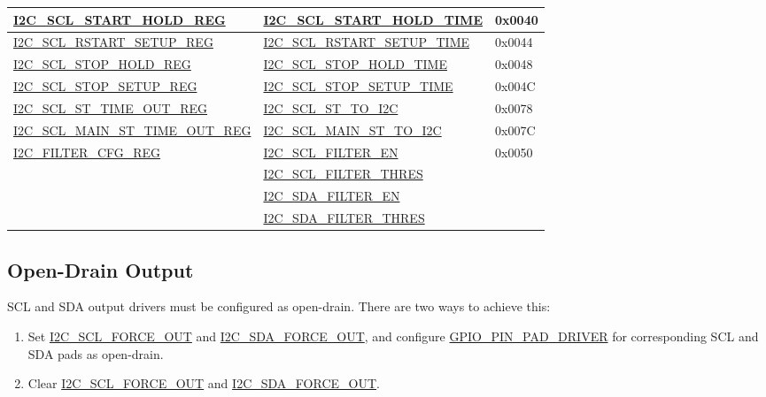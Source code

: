 \documentclass[main\_\_EN.tex]{subfiles}
\begin{document}
\begin{longtable}{ | p{6cm} | p{7cm} | p{2cm} | }
\hyperref[regdesc:I2CSCLSTARTHOLDREG]{I2C\_SCL\_START\_HOLD\_REG} & \hyperref[fielddesc:I2CSCLSTARTHOLDTIME]{I2C\_SCL\_START\_HOLD\_TIME} & 0x0040  \\ \hline
\hyperref[regdesc:I2CSCLRSTARTSETUPREG]{I2C\_SCL\_RSTART\_SETUP\_REG} & \hyperref[fielddesc:I2CSCLRSTARTSETUPTIME]{I2C\_SCL\_RSTART\_SETUP\_TIME} & 0x0044  \\ \hline

\hyperref[regdesc:I2CSCLSTOPHOLDREG]{I2C\_SCL\_STOP\_HOLD\_REG} & \hyperref[fielddesc:I2CSCLSTOPHOLDTIME]{I2C\_SCL\_STOP\_HOLD\_TIME} & 0x0048  \\ \hline
\hyperref[regdesc:I2CSCLSTOPSETUPREG]{I2C\_SCL\_STOP\_SETUP\_REG} & \hyperref[fielddesc:I2CSCLSTOPSETUPTIME]{I2C\_SCL\_STOP\_SETUP\_TIME} & 0x004C  \\ \hline

\hyperref[regdesc:I2CSCLSTTIMEOUTREG]{I2C\_SCL\_ST\_TIME\_OUT\_REG}& \hyperref[fielddesc:I2CSCLSTTOI2C]{I2C\_SCL\_ST\_TO\_I2C} & 0x0078\\ \hline
\hyperref[regdesc:I2CSCLMAINSTTIMEOUTREG]{I2C\_SCL\_MAIN\_ST\_TIME\_OUT\_REG}& \hyperref[fielddesc:I2CSCLMAINSTTOI2C]{I2C\_SCL\_MAIN\_ST\_TO\_I2C} & 0x007C\\ \hline

\hyperref[regdesc:I2CFILTERCFGREG]{I2C\_FILTER\_CFG\_REG} & {\hyperref[fielddesc:I2CSCLFILTEREN]{I2C\_SCL\_FILTER\_EN}} & 0x0050  \\\cline{2-2}
& {\hyperref[fielddesc:I2CSCLFILTERTHRES]{I2C\_SCL\_FILTER\_THRES}}& \\\cline{2-2}
& {\hyperref[fielddesc:I2CSDAFILTEREN]{I2C\_SDA\_FILTER\_EN}} &  \\\cline{2-2}
& {\hyperref[fielddesc:I2CSDAFILTERTHRES]{I2C\_SDA\_FILTER\_THRES}} & \\ \hline
\end{longtable}

\subsection{Open-Drain Output}
SCL and SDA output drivers must be configured as open-drain. There are two ways to achieve this: 
\begin{enumerate}
\item Set \hyperref[fielddesc:I2CSCLFORCEOUT]{I2C\_SCL\_FORCE\_OUT} and \hyperref[fielddesc:I2CSDAFORCEOUT]{I2C\_SDA\_FORCE\_OUT}, and configure \hyperref[fielddesc:GPIOPINNPADDRIVER]{GPIO\_PIN\_PAD\_DRIVER} for corresponding SCL and SDA pads as open-drain.
\item Clear \hyperref[fielddesc:I2CSCLFORCEOUT]{I2C\_SCL\_FORCE\_OUT} and \hyperref[fielddesc:I2CSDAFORCEOUT]{I2C\_SDA\_FORCE\_OUT}.
\end{enumerate}
\end{document}
